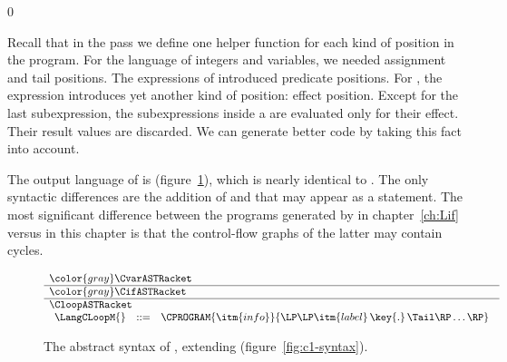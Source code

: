 \documentclass[7x10]{TimesAPriori_MIT}%
\newcommand{\gray}[1]{{\color{gray} #1}}
\def\racketEd{0}
\def\edition{0}
\numberwithin{theorem}{chapter}
\numberwithin{definition}{chapter}
\numberwithin{equation}{chapter}
\begin{document}
{\if\edition\racketEd

Recall that in the  pass we define one helper
function for each kind of position in the program.  For the \LangVar{}
language of integers and variables, we needed assignment and tail
positions. The  expressions of \LangIf{} introduced predicate
positions. For \LangLoop{}, the  expression introduces yet
another kind of position: effect position. Except for the last
subexpression, the subexpressions inside a  are evaluated
only for their effect. Their result values are discarded. We can
generate better code by taking this fact into account.

The output language of  is \LangCLoop{}
(figure~\ref{fig:c7-syntax}), which is nearly identical to
\LangCIf{}. The only syntactic differences are the addition of \VOID{}
and that  may appear as a statement.  The most significant
difference between the programs generated by 
in chapter~\ref{ch:Lif} versus  in this
chapter is that the control-flow graphs of the latter may contain
cycles.

\begin{figure}[tp]
\begin{tcolorbox}[colback=white]    
\small
\[
\begin{array}{l}
  \gray{\CvarASTRacket} \\ \hline
  \gray{\CifASTRacket} \\ \hline
  \CloopASTRacket \\
\begin{array}{lcl}
\LangCLoopM{} & ::= & \CPROGRAM{\itm{info}}{\LP\LP\itm{label}\,\key{.}\,\Tail\RP\ldots\RP}
\end{array}
\end{array}
\]
\end{tcolorbox}

\caption{The abstract syntax of \LangCLoop{}, extending \LangCIf{} (figure~\ref{fig:c1-syntax}).}
\label{fig:c7-syntax}
\end{figure}

}
\end{document}
